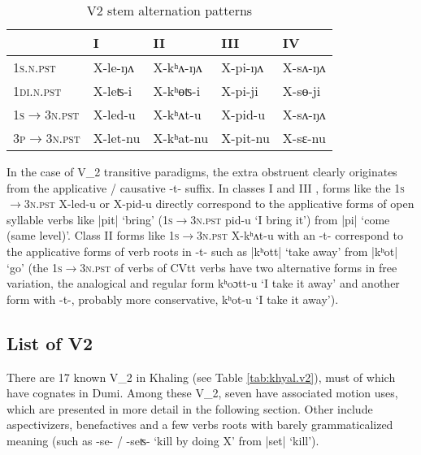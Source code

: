 \documentclass[oneside,a4paper,11pt]{article}
\newcommand{\ipa}[1]{{\phon#1}}
\newcommand{\dhatu}[2]{|\ipa{#1}| `#2'}
\begin{document}
\begin{table}[H] 
\caption{V2 stem alternation patterns} \label{tab:le.khAt.pi} \centering 
\begin{tabular}{lllll} 
\toprule 
&   I  &   II & III &  IV \\
\midrule
\textsc{1s.n.pst} &  \ipa{X-le-ŋʌ} & \ipa{X-kʰʌ-ŋʌ} &  \ipa{X-pi-ŋʌ}&  \ipa{X-sʌ-ŋʌ} \\
\textsc{1di.n.pst} &  \ipa{X-leʦ-i} & \ipa{X-kʰɵʦ-i} & \ipa{X-pi-ji} &  \ipa{X-sɵ-ji}   \\
\hline 
\textsc{1s$\rightarrow$3n.pst} &  \ipa{X-led-u} &  \ipa{X-kʰʌt-u} &   \ipa{X-pid-u} & \ipa{X-sʌ-ŋʌ} \\
\textsc{3p$\rightarrow$3n.pst} &    \ipa{X-let-nu} &    \ipa{X-kʰat-nu} & \ipa{X-pit-nu} & \ipa{X-sɛ-nu} \\
\bottomrule 
\end{tabular}
\end{table}

In the case of V_2 transitive paradigms, the extra obstruent clearly originates from the applicative / causative \ipa{-t-} suffix. In classes I and III , forms like the \textsc{1s$\rightarrow$3n.pst} \ipa{X-led-u}  or  \ipa{X-pid-u} directly correspond to the applicative forms of open syllable verbs like \dhatu{pit}{bring} (\textsc{1s$\rightarrow$3n.pst}  \ipa{pid-u} `I bring it') from \dhatu{pi}{come (same level)}. Class II forms like \textsc{1s$\rightarrow$3n.pst}  \ipa{X-kʰʌt-u} with an \ipa{-t-} correspond to the applicative forms of verb roots in \ipa{-t-} such as \dhatu{kʰott}{take away} from \dhatu{kʰot}{go} (the \textsc{1s$\rightarrow$3n.pst} of verbs of \ipa{CVtt} verbs have two alternative forms in free variation, the analogical and regular form \ipa{kʰoɔtt-u} `I take it away' and another form with \ipa{-t-}, probably more conservative, \ipa{kʰot-u} `I take it away').

\subsection{List of V2}
There are 17 known V_2 in Khaling (see Table \ref{tab:khyal.v2}), must of which have cognates in Dumi. Among these V_2, seven have associated motion uses, which are presented in more detail in the following section. Other include aspectivizers, benefactives and a few verbs roots with barely grammaticalized meaning (such as  \ipa{-se- / -seʦ-} `kill by doing X' from \dhatu{set}{kill}).
\end{document}
